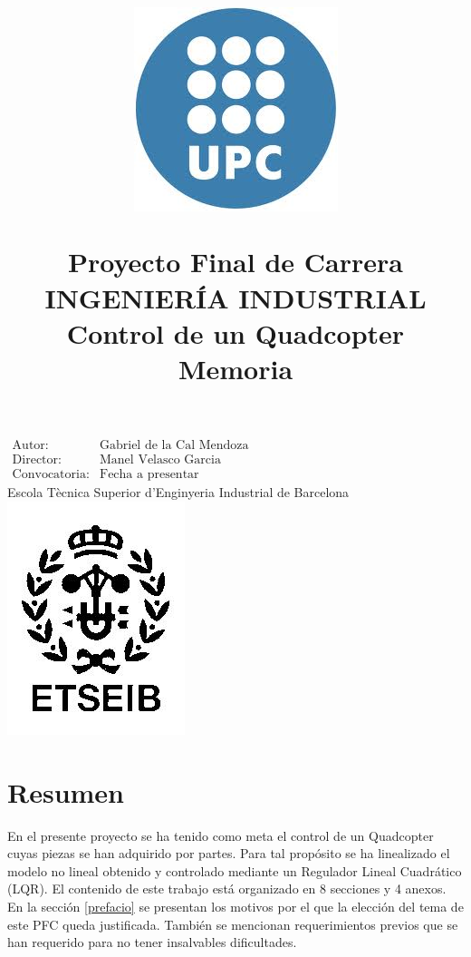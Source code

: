 \documentclass[twoside]{article}
\title{\begin{center} 
\includegraphics[scale=0.3]{images/upc.jpg} 
\end{center} 
\vspace{1cm} 
Proyecto Final de Carrera\\
INGENIERÍA INDUSTRIAL \\
\vspace{1.5cm} 
\Huge{Control de un Quadcopter} 
\vspace{2cm} \\ 
Memoria}
\date{}
\begin{document}
\maketitle
\begin{center}
\large{
$\begin{array}{ll}
\mbox{Autor:} & \mbox{Gabriel de la Cal Mendoza} \\
\mbox{Director:} & \mbox{Manel Velasco Garcia} \\
\mbox{Convocatoria:} & \mbox{Fecha a presentar}
\end{array}$}
\\ \vspace{2cm} \Large{Escola Tècnica Superior d'Enginyeria Industrial de Barcelona}\\ \vspace{1cm}
\includegraphics[scale=0.4]{images/etseib.jpg}
\end{center}

\thispagestyle{empty}
\newpage
\begin{center}

\end{center}
\thispagestyle{empty}
\newpage
\setcounter{page}{1}

\section*{Resumen}

En el presente proyecto se ha tenido como meta el control de un Quadcopter cuyas piezas se han adquirido por partes. Para tal propósito se ha linealizado  el modelo no lineal obtenido y controlado mediante un Regulador Lineal Cuadrático (LQR). El contenido de este trabajo está organizado en 8 secciones y 4 anexos.\\

En la sección \ref{prefacio} se presentan los motivos por el que la elección del tema de este PFC queda justificada. También se mencionan requerimientos previos que se han requerido para no tener insalvables dificultades. 
\end{document}
